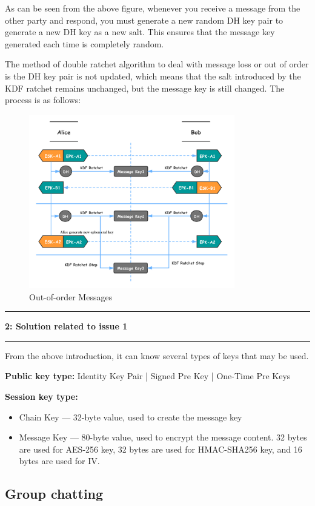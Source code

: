 \documentclass[11pt]{article}
\newcommand\question[2]{\vspace{.25in}\hrule\textbf{#1: #2}\vspace{.5em}\hrule\vspace{.10in}}
\begin{document}
As can be seen from the above figure, whenever you receive a message from the other party and respond, you must generate a new random DH key pair to generate a new DH key as a new salt. 
This ensures that the message key generated each time is completely random.

The method of double ratchet algorithm to deal with message loss or out of order is the DH key pair is not updated, which means that the salt introduced by the KDF ratchet remains unchanged, but the message key is still changed. 
The process is as follows:

\begin{figure}[H]
    \centering
    \includegraphics[width=0.8\textwidth]{Fig5} 
    \caption{Out-of-order Messages}
\end{figure}



\question{2}{Solution related to issue 1}

From the above introduction, it can know several types of keys that may be used.

\textbf{Public key type:} Identity Key Pair | Signed Pre Key | One-Time Pre Keys


\textbf{Session key type:}
\begin{itemize}
    \item Chain Key --- 32-byte value, used to create the message key
    \item Message Key --- 80-byte value, used to encrypt the message content. 
    32 bytes are used for AES-256 key, 32 bytes are used for HMAC-SHA256 key, and 16 bytes are used for IV.
\end{itemize}


\subsection{Group chatting}
\end{document}
